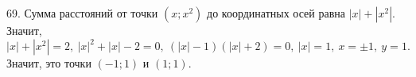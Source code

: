 69. Сумма расстояний от точки $(x;x^2)$ до координатных осей равна $|x|+|x^2|.$ Значит, $|x|+|x^2|=2,\ |x|^2+|x|-2=0,\ (|x|-1)(|x|+2)=0,\ |x|=1,\ x=\pm1,\ y=1.$ Значит, это точки $(-1;1)$ и $(1;1).$\\
